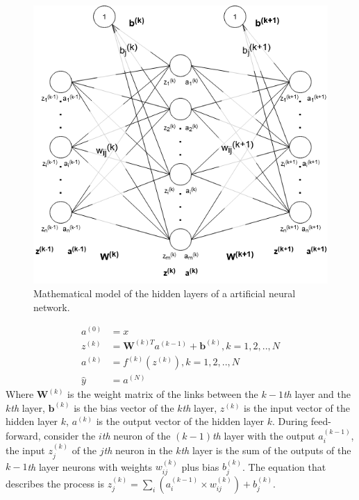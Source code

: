 \documentclass[conference]{IEEEtran}
\begin{document}
\begin{figure}[ht]
	\centerline{\includegraphics[scale=0.35]{images/ann.png}}
  	\caption{Mathematical model of the hidden layers of a artificial neural network.}
  	\label{fig:ann}
\end{figure}
\begin{align}
	a^{(0)}&=x \nonumber\\
	z^{(k)}&={\boldsymbol{W}^{(k)T}}{a^{(k-1)}}+{\boldsymbol{b}}^{(k)},k=1,2,..,N \label{ann_eq}\\
	a^{(k)}&=f^{(k)}\left(z^{(k)}\right),k=1,2,..,N \nonumber\\
	\widehat{y}&=a^{(N)} \nonumber
\end{align}
Where $\boldsymbol{W}^{(k)}$ is the weight matrix of the links between the $k-1$\emph{th} layer and the $k$\emph{th} layer, $\boldsymbol{b}^{(k)}$ is the bias vector of the $k$\emph{th} layer, $ z ^ {(k)} $ is the input vector of the hidden layer $ k $, $ a ^ {(k)} $ is the output vector of the hidden layer $ k $. During feed-forward, consider the $i$\emph{th} neuron of the $ (k-1) $\emph{th} layer with the output $ a ^ {(k-1)} _ i $, the input $ z ^ {(k)} _ j $ of the $ j $\emph{th} neuron in the $ k $\emph{th} layer is the sum of the outputs of the $ k-1 $\emph{th} layer neurons with weights $ w ^ {(k)} _ {ij} $ plus bias $ b ^ {(k)} _ {j} $. The equation that describes the process is $z^{(k)}_j={\sum_i} \left( {a^{(k-1)}_i} \times {w^{(k)}_{ij}} \right) + {{b}^{(k)}_j}$.
\end{document}
